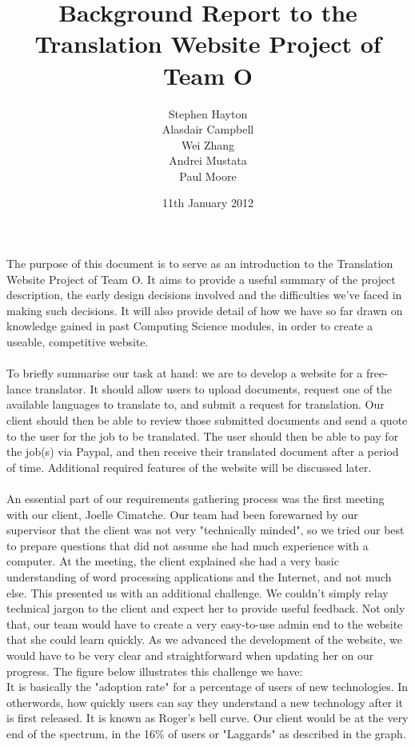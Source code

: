 \documentclass{article}
\title{Background Report to the Translation Website Project of Team O}
\author{Stephen Hayton
	\\Alasdair Campbell
	\\Wei Zhang
	\\Andrei Mustata
	\\Paul Moore}
\date{11th January 2012}
\begin{document}
\maketitle

The purpose of this document is to serve as an introduction to the Translation Website Project of Team O. It aims to provide a useful summary of the project description, the early design decisions involved and the difficulties we've faced in making such decisions. It will also provide detail of how we have so far drawn on knowledge gained in past Computing Science modules, in order to create a useable, competitive website.\\
\\
To briefly summarise our task at hand: we are to develop a website for a free-lance translator. It should allow users to upload documents, request one of the available languages to translate to, and submit a request for translation. Our client should then be able to review those submitted documents and send a quote to the user for the job to be translated. The user should then be able to pay for the job(s) via Paypal, and then receive their translated document after a period of time. Additional required features of the website will be discussed later.\\
\\
An essential part of our requirements gathering process was the first meeting with our client, Joelle Cimatche. Our team had been forewarned by our supervisor that the client was not very "technically minded", so we tried our best to prepare questions that did not assume she had much experience with a computer. At the meeting, the client explained she had a very basic understanding of word processing applications and the Internet, and not much else. This presented us with an additional challenge. We couldn't simply relay technical jargon to the client and expect her to provide useful feedback. Not only that, our team would have to create a very easy-to-use admin end to the website that she could learn quickly. As we advanced the development of the website, we would have to be very clear and straightforward when updating her on our progress. The figure below illustrates this challenge we have:\\ It is basically the "adoption rate" for a percentage of users of new technologies. In otherwords, how quickly users can say they understand a new technology after it is first released. It is known as Roger's bell curve. Our client would be at the very end of the spectrum, in the 16\% of users or "Laggards" as described in the graph.\\
\end{document}
